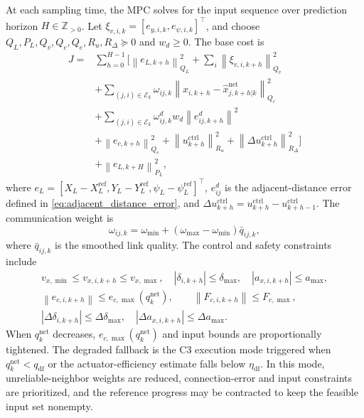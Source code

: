 \documentclass[twocolumn,3p,times,procedia]{elsarticle}
\newcommand{\norm}[1]{\left\lVert #1 \right\rVert}
\begin{document}
At each sampling time, the MPC solves for the input sequence over prediction horizon $H\in\mathbb Z_{>0}$. Let $\xi_{v,i,k}=[e_{y,i,k},e_{\psi,i,k}]^\top$, and choose $Q_L,P_L,Q_v,Q_c,Q_e,R_u,R_\Delta\succeq0$ and $w_d\ge0$. The base cost is
\begin{equation}
\begin{aligned}
J=&\sum_{h=0}^{H-1}
\Big[
\norm{e_{L,k+h}}_{Q_L}^2+
\sum_i\norm{\xi_{v,i,k+h}}_{Q_v}^2\\
&+\sum_{(j,i)\in\mathcal E_k}\omega_{ij,k}\norm{x_{i,k+h}-\hat x_{j,k+h|k}^{\mathrm{net}}}_{Q_c}^2\\
&+\sum_{(j,i)\in\mathcal E_k}\omega^d_{ij,k}w_d\norm{e^d_{ij,k+h}}^2\\
&+\norm{e_{c,k+h}}_{Q_e}^2+
\norm{u_{k+h}^{\mathrm{ctrl}}}_{R_u}^2+
\norm{\Delta u_{k+h}^{\mathrm{ctrl}}}_{R_\Delta}^2
\Big]\\
&+\norm{e_{L,k+H}}_{P_L}^2 ,
\end{aligned}
\label{eq:mpc_cost}
\end{equation}
where $e_L=[X_L-X_L^{\mathrm{ref}},Y_L-Y_L^{\mathrm{ref}},\psi_L-\psi_L^{\mathrm{ref}}]^\top$, $e^d_{ij}$ is the adjacent-distance error defined in \eqref{eq:adjacent_distance_error}, and $\Delta u_{k+h}^{\mathrm{ctrl}}=u_{k+h}^{\mathrm{ctrl}}-u_{k+h-1}^{\mathrm{ctrl}}$. The communication weight is
\begin{equation}
\omega_{ij,k}=\omega_{\min}+(\omega_{\max}-\omega_{\min})\bar q_{ij,k},
\label{eq:comm_weight}
\end{equation}
where $\bar q_{ij,k}$ is the smoothed link quality. The control and safety constraints include
\begin{equation}
\begin{gathered}
v_{x,\min}\le v_{x,i,k+h}\le v_{x,\max},\quad
|\delta_{i,k+h}|\le\delta_{\max},\quad
|a_{x,i,k+h}|\le a_{\max},\\
\norm{e_{c,i,k+h}}\le e_{c,\max}(q_k^{\mathrm{net}}),\qquad
\norm{F_{c,i,k+h}}\le F_{c,\max},\\
|\Delta \delta_{i,k+h}|\le \Delta\delta_{\max},\quad
|\Delta a_{x,i,k+h}|\le \Delta a_{\max}.
\end{gathered}
\label{eq:constraints}
\end{equation}
When $q_k^{\mathrm{net}}$ decreases, $e_{c,\max}(q_k^{\mathrm{net}})$ and input bounds are proportionally tightened. The degraded fallback is the C3 execution mode triggered when $q_k^{\mathrm{net}}<q_{\mathrm{df}}$ or the actuator-efficiency estimate falls below $\eta_{\mathrm{df}}$. In this mode, unreliable-neighbor weights are reduced, connection-error and input constraints are prioritized, and the reference progress may be contracted to keep the feasible input set nonempty.
\end{document}
